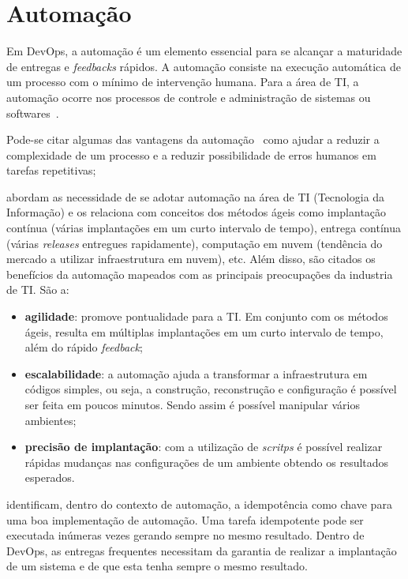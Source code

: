 \section{Automação}
\label{sec:auto}

Em DevOps, a automação é um elemento essencial para se alcançar a maturidade
de entregas e \textit{feedbacks} rápidos. A automação consiste na execução
automática de um processo com o mínimo de intervenção humana. Para a área
de TI, a automação ocorre nos processos de controle e administração de
sistemas ou softwares~\cite{sharma:2015}.

Pode-se citar algumas das vantagens da automação~\cite{sharma:2015} como
ajudar a reduzir a complexidade de um processo e a reduzir
possibilidade de erros humanos em tarefas repetitivas;

 abordam as necessidade de se adotar automação na área
de TI (Tecnologia da Informação) e os relaciona com conceitos dos métodos ágeis como
implantação contínua (várias implantações em um curto intervalo de tempo), entrega contínua (várias
\textit{releases} entregues rapidamente), computação em nuvem (tendência do mercado a
utilizar infraestrutura em nuvem), etc. Além disso, são citados os benefícios da
automação mapeados com as principais preocupações da industria de TI. São a:

\begin{itemize}
  \item \textbf{agilidade}: promove pontualidade para a TI. Em conjunto
    com os métodos ágeis, resulta em múltiplas implantações em um curto intervalo
    de tempo, além do rápido \textit{feedback};
  \item \textbf{escalabilidade}: a automação ajuda a transformar a infraestrutura
    em códigos simples, ou seja, a construção, reconstrução e configuração é possível
    ser feita em poucos minutos. Sendo assim é possível manipular vários ambientes;
  \item \textbf{precisão de implantação}: com a utilização de \textit{scritps}
    é possível realizar rápidas mudanças nas configurações de um ambiente
    obtendo os resultados esperados.
\end{itemize}

 identificam, dentro do contexto de automação, a idempotência
como chave para uma boa implementação de automação. Uma tarefa idempotente pode ser
executada inúmeras vezes gerando sempre no mesmo resultado. Dentro de DevOps,
as entregas frequentes necessitam da garantia de realizar a implantação de um
sistema e de que esta tenha sempre o mesmo resultado.

